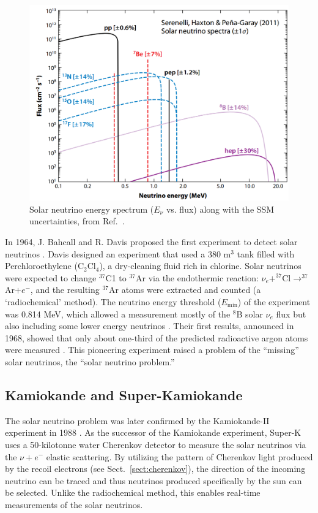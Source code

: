 \begin{figure}[htbp]
	\centering	
	\includegraphics[width=12cm]{haxton09.png}
	\caption[Solar neutrino energy spectrum.]{Solar neutrino energy spectrum ($E_\nu$ vs. flux) along with the SSM uncertainties, from Ref.~\cite{haxton2013solar}.}
	\label{fig:haxton2013plot}
\end{figure}
In 1964, J. Bahcall and R. Davis proposed the first experiment to detect solar neutrinos \cite{bahcall1964solar,davis1964solar}. Davis designed an experiment that used a 380 m$^3$ tank filled with Perchloroethylene (C$_2$Cl$_4$), a dry-cleaning fluid rich in chlorine. Solar neutrinos were expected to change $^{37}$C1 to $^{37}$Ar via the endothermic reaction: $\nu_e+^{37}$Cl$\to^{37}$Ar$+e^-$, and the resulting $^{37}$Ar atoms were extracted and counted (a `radiochemical' method). The neutrino energy threshold ($E_{\mathrm{min}}$) of the experiment was 0.814 MeV, which allowed a measurement mostly of the $^8$B solar $\nu_e$ flux but also including some lower energy neutrinos \cite{davis1964solar}. Their first results, announced in 1968, showed that only about one-third of the predicted radioactive argon atoms were measured \cite{davis1968search}. This pioneering experiment raised a problem of the ``missing'' solar neutrinos, the ``solar neutrino problem.''

\subsection{Kamiokande and Super-Kamiokande}\label{sect:superKsolarnu}

The solar neutrino problem was later confirmed by the Kamiokande-II experiment in 1988 \cite{superKwebsite}. As the successor of the Kamiokande experiment, Super-K uses a 50-kilotonne water Cherenkov detector to measure the solar neutrinos via the $\nu+e^-$ elastic scattering. By utilizing the pattern of Cherenkov light produced by the recoil electrons (see Sect.~\ref{sect:cherenkov}), the direction of the incoming neutrino can be traced and thus neutrinos produced specifically by the sun can be selected. Unlike the radiochemical method, this enables real-time measurements of the solar neutrinos.

